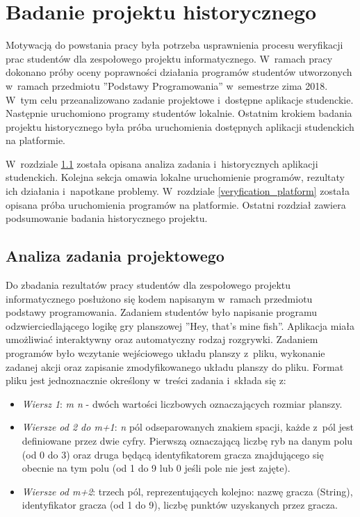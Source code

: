 \chapter{Badanie projektu historycznego}
\label{chapter:verify}

Motywacją do powstania pracy była potrzeba usprawnienia procesu weryfikacji prac studentów dla zespołowego projektu informatycznego.
W~ramach pracy dokonano próby oceny poprawności działania programów studentów utworzonych w~ramach przedmiotu ”Podstawy Programowania” w~semestrze zima 2018.
W~tym celu przeanalizowano zadanie projektowe i~dostępne aplikacje studenckie.
Następnie uruchomiono programy studentów lokalnie.
Ostatnim krokiem badania projektu historycznego była próba uruchomienia dostępnych aplikacji studenckich na platformie.

W~rozdziale \ref{analysis_students_projects} została opisana analiza zadania i~historycznych aplikacji studenckich.
Kolejna sekcja omawia lokalne uruchomienie programów, rezultaty ich działania i~napotkane problemy.
W~rozdziale \ref{veryfication_platform} została opisana próba uruchomienia programów na platformie.
Ostatni rozdział zawiera podsumowanie badania historycznego projektu.

\section{Analiza zadania projektowego}
\label{analysis_students_projects}

Do zbadania rezultatów pracy studentów dla zespołowego projektu informatycznego posłużono się kodem napisanym w~ramach przedmiotu podstawy programowania.
Zadaniem studentów było napisanie programu odzwierciedlającego logikę gry planszowej ”Hey, that’s mine fish”.
Aplikacja miała umożliwiać interaktywny oraz automatyczny rodzaj rozgrywki.
Zadaniem programów było wczytanie wejściowego układu planszy z~pliku, wykonanie zadanej akcji oraz zapisanie zmodyfikowanego układu planszy do pliku.
Format pliku jest jednoznacznie określony w~treści zadania i~składa się z:
\begin{itemize}
    \item \textit{Wiersz 1}: \textit{m n} - dwóch wartości liczbowych oznaczających rozmiar planszy.
    \item \textit{Wiersze od 2 do m+1}: \textit{n} pól odseparowanych znakiem spacji, każde z~pól jest definiowane przez dwie cyfry.
    Pierwszą oznaczającą liczbę ryb na danym polu (od 0 do 3) oraz druga będącą identyfikatorem gracza znajdującego się obecnie na tym polu (od 1 do 9 lub 0 jeśli pole nie jest zajęte).
    \item \textit{Wiersze od m+2}: trzech pól, reprezentujących kolejno: nazwę gracza (String), identyfikator gracza (od 1 do 9), liczbę punktów uzyskanych przez gracza.
\end{itemize}

